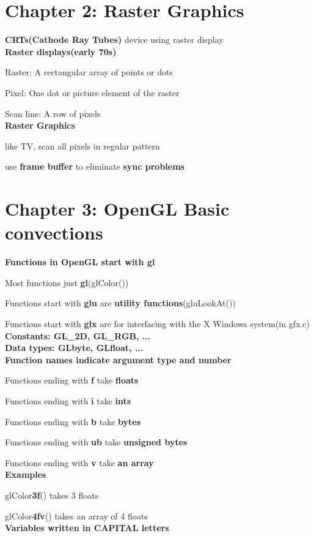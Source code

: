 \documentclass[]{report}
\begin{document}
\section*{Chapter 2: Raster Graphics}
\textbf{CRTs(Cathode Ray Tubes)} device using raster display\\
\textbf{Raster displays(early 70s)}

Raster: A rectangular array of points or dots

Pixel: One dot or picture element of the raster

Scan line: A row of pixels\\
\textbf{Raster Graphics}

like TV, scan all pixels in regular pattern

use \textbf{frame buffer} to eliminate \textbf{sync problems}\\


\section*{Chapter 3: OpenGL Basic convections}
\textbf{Functions in OpenGL start with \textbf{gl}}

Most functions just \textbf{gl}(glColor())

Functions start with \textbf{glu} are \textbf{utility functions}(gluLookAt())

Functions start with \textbf{glx} are for interfacing with the X Windows system(in gfx.c)\\
\textbf{Constants: GL\_2D, GL\_RGB, ...}
\\
\textbf{Data types: GLbyte, GLfloat, ...}
\\
\textbf{Function names indicate argument type and number}

Functions ending with \textbf{f} take \textbf{floats}

Functions ending with \textbf{i} take \textbf{ints}

Functions ending with \textbf{b} take \textbf{bytes}

Functions ending with \textbf{ub} take \textbf{unsigned bytes}

Functions ending with \textbf{v} take \textbf{an array}\\
\textbf{Examples}

glColor\textbf{3f}() takes 3 floats

glColor\textbf{4fv}() takes an array of 4 floats\\
\textbf{Variables written in CAPITAL letters}
\end{document}
